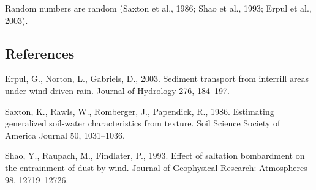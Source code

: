 \documentclass[]{article}
\begin{document}
Random numbers are random (Saxton et al., 1986; Shao et al., 1993; Erpul
et al., 2003).

\subsection*{References}\label{references}

\hypertarget{refs}{}
\hypertarget{ref-erpul2003sediment}{}
Erpul, G., Norton, L., Gabriels, D., 2003. Sediment transport from
interrill areas under wind-driven rain. Journal of Hydrology 276,
184--197.

\hypertarget{ref-saxton1986estimating}{}
Saxton, K., Rawls, W., Romberger, J., Papendick, R., 1986. Estimating
generalized soil-water characteristics from texture. Soil Science
Society of America Journal 50, 1031--1036.

\hypertarget{ref-shao1993effect}{}
Shao, Y., Raupach, M., Findlater, P., 1993. Effect of saltation
bombardment on the entrainment of dust by wind. Journal of Geophysical
Research: Atmospheres 98, 12719--12726.
\end{document}
